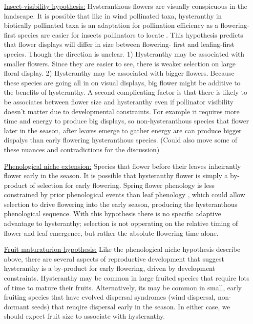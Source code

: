 \documentclass{article}[11pt]
\begin{document}
\underline{Insect-visibility hypothesis:} Hysteranthous flowers are visually conspicuous in the landscape. It is possible that like in wind pollinated taxa, hysteranthy in biotically pollinated taxa is an adaptation for pollination efficiency as a flowering-first species are easier for insects pollinators to locate \citep{}. This hypothesis predicts that flower displays will differ in size between flowering- first and leafing-first species. Though the direction is unclear. 1) Hysteranthy may be associated with smaller flowers. Since they are easier to see, there is weaker selection on large floral display. 2) Hysteranthy may be associated with bigger flowers. Because these species are going all in on visual displays, big flower might be additive to the benefits of hysteranthy. A second complicating factor is that there is likely to be associates between flower size and hysteranthy even if pollinator visibility doesn't matter due to developmental constraints. For example it requires more time and energy to produce big displays, so non-hysteranthous species that flower later in the season, after leaves emerge to gather energy are can produce bigger dispalys than early flowering hysteranthous species. (Could also move some of these nuances and contradictions for the discussion)

\underline{Phenological niche extension:} Species that flower before their leaves inheirantly flower early in the season. It is possible that hysteranthy flower is simply a by-product of selection for early flowering.
 Spring flower phenology is less constrained by prior phenological events than leaf phenology \citep{Savage2019}, which could allow selection to drive flowering into the early season, producing the hysteranthous phenological sequence. With this hypothesis there is no specific adaptive advantage to hysteranthy;  selection is not opperating on the relative timing of flower and leaf emergence, but rather the absolute flowering time alone.

\underline{Fruit maturaturion hypothesis:} Like the phenological niche hypothesis describe above, there are several aspects of reproductive development that suggest hysteranthy is a by-product for early flowering, driven by development constraints. Hysteranthy may be common in large fruited species that require lots of time to mature their fruits. Alternatively, its may be common in small, early fruiting species that have evolved dispersal syndromes (wind dispersal, non-dormant seeds) that reuqire dispersal early in the season. In either case, we  should expect fruit size to associate with hysteranthy.
\end{document}
